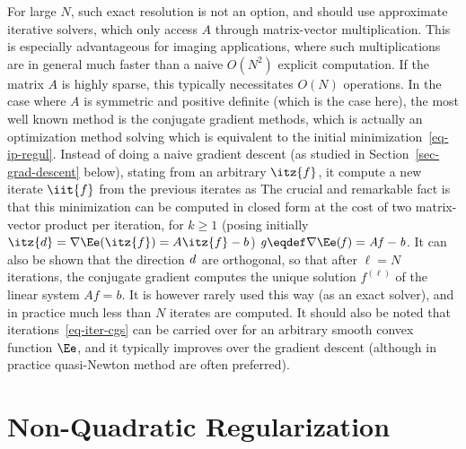For large $N$, such exact resolution is not an option, and should use approximate iterative solvers, which only access $A$ through matrix-vector multiplication. This is especially advantageous for imaging applications, where such multiplications are in general much faster than a naive $O(N^2)$ explicit computation. If the matrix $A$ is highly sparse, this typically necessitates $O(N)$ operations. 
%
In the case where $A$ is symmetric and positive definite (which is the case here), the most well known method is the conjugate gradient methods, which is actually an optimization method solving
which is equivalent to the initial minimization~\eqref{eq-ip-regul}. Instead of doing a naive gradient descent (as studied in Section~\ref{sec-grad-descent} below), stating from an arbitrary $\itz{f}$, it compute a new iterate $\iit{f}$ from the previous iterates as
The crucial and remarkable fact is that this minimization can be computed in closed form at the cost of two matrix-vector product per iteration, for $k \geq 1$ (posing initially $\itz{d} = \nabla \Ee(\itz{f}) = A\itz{f}-b$)
$\it{g} \eqdef \nabla \Ee(\it{f}) = A\it{f}-b$.
%
It can also be shown that the direction $\it{d}$ are orthogonal, so that after $\ell=N$ iterations, the conjugate gradient computes the unique solution $f^{(\ell)}$ of the linear system $A f = b$.  It is however rarely used this way (as an exact solver), and in practice much less than $N$ iterates are computed.
%
It should also be noted that iterations~\eqref{eq-iter-cgs} can be carried over for an arbitrary smooth convex function $\Ee$, and it typically improves over the gradient descent (although in practice quasi-Newton method are often preferred). 



\section{Non-Quadratic Regularization}

